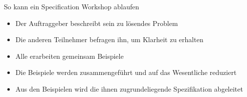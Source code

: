 %
%



\begin{frame}{So kann ein Specification Workshop ablaufen}

\begin{itemize}
	\item Der Auftraggeber beschreibt sein zu lösendes Problem
	\item Die anderen Teilnehmer befragen ihn, um Klarheit zu erhalten
	\item Alle erarbeiten gemeinsam Beispiele
	\item Die Beispiele werden zusammengeführt und auf das Wesentliche reduziert
	\item Aus den Beispielen wird die ihnen zugrundeliegende Spezifikation abgeleitet
\end{itemize}

\end{frame}


